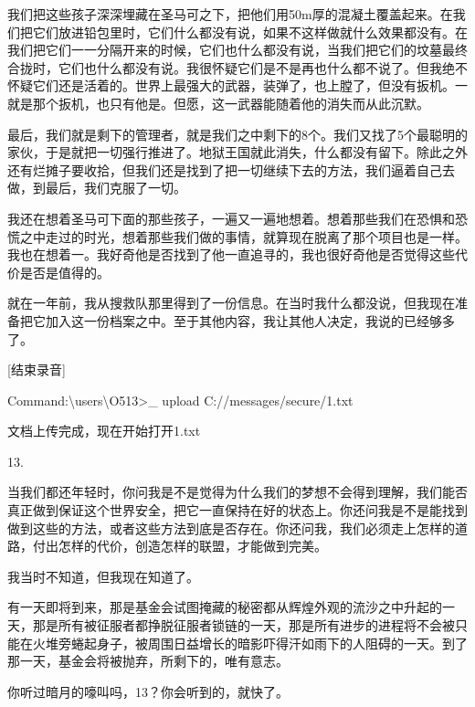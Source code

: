 我们把这些孩子深深埋藏在圣马可之下，把他们用50m厚的混凝土覆盖起来。在我们把它们放进铅包里时，它们什么都没有说，如果不这样做就什么效果都没有。在我们把它们一一分隔开来的时候，它们也什么都没有说，当我们把它们的坟墓最终合拢时，它们也什么都没有说。我很怀疑它们是不是再也什么都不说了。但我绝不怀疑它们还是活着的。世界上最强大的武器，装弹了，也上膛了，但没有扳机。一就是那个扳机，也只有他是。但愿，这一武器能随着他的消失而从此沉默。

最后，我们就是剩下的管理者，就是我们之中剩下的8个。我们又找了5个最聪明的家伙，于是就把一切强行推进了。地狱王国就此消失，什么都没有留下。除此之外还有烂摊子要收拾，但我们还是找到了把一切继续下去的方法，我们逼着自己去做，到最后，我们克服了一切。

我还在想着圣马可下面的那些孩子，一遍又一遍地想着。想着那些我们在恐惧和恐慌之中走过的时光，想着那些我们做的事情，就算现在脱离了那个项目也是一样。我也在想着一。我好奇他是否找到了他一直追寻的，我也很好奇他是否觉得这些代价是否是值得的。

就在一年前，我从搜救队那里得到了一份信息。在当时我什么都没说，但我现在准备把它加入这一份档案之中。至于其他内容，我让其他人决定，我说的已经够多了。

[结束录音]

\begin{scpboxc}
Command:\textbackslash users\textbackslash O513>\_ upload C://messages/secure/1.txt
\end{scpboxc}


\begin{scpboxc}
文档上传完成，现在开始打开1.txt
\end{scpboxc}


\begin{scpboxbbwm}

13.

当我们都还年轻时，你问我是不是觉得为什么我们的梦想不会得到理解，我们能否真正做到保证这个世界安全，把它一直保持在好的状态上。你还问我是不是能找到做到这些的方法，或者这些方法到底是否存在。你还问我，我们必须走上怎样的道路，付出怎样的代价，创造怎样的联盟，才能做到完美。

我当时不知道，但我现在知道了。

有一天即将到来，那是基金会试图掩藏的秘密都从辉煌外观的流沙之中升起的一天，那是所有被征服者都挣脱征服者锁链的一天，那是所有进步的进程将不会被只能在火堆旁蜷起身子，被周围日益增长的暗影吓得汗如雨下的人阻碍的一天。到了那一天，基金会将被抛弃，所剩下的，唯有意志。

你听过暗月的嚎叫吗，13？你会听到的，就快了。


\end{scpboxbbwm}

